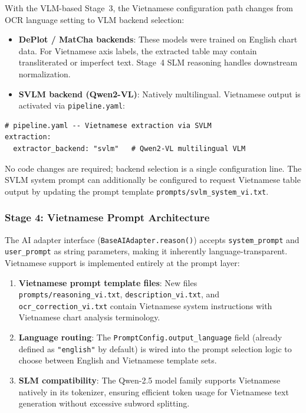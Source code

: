 With the VLM-based Stage~3, the Vietnamese configuration path changes from OCR language
setting to VLM backend selection:

\begin{itemize}
    \item \textbf{DePlot / MatCha backends}: These models were trained on English chart
          data. For Vietnamese axis labels, the extracted table may contain transliterated
          or imperfect text. Stage~4 SLM reasoning handles downstream normalization.
    \item \textbf{SVLM backend (Qwen2-VL)}: Natively multilingual. Vietnamese output is
          activated via \texttt{pipeline.yaml}:
\end{itemize}

\begin{verbatim}
# pipeline.yaml -- Vietnamese extraction via SVLM
extraction:
  extractor_backend: "svlm"   # Qwen2-VL multilingual VLM
\end{verbatim}

No code changes are required; backend selection is a single configuration line.
The SVLM system prompt can additionally be configured to request Vietnamese table output
by updating the prompt template \texttt{prompts/svlm\_system\_vi.txt}.

\subsubsection{Stage 4: Vietnamese Prompt Architecture}

The AI adapter interface (\texttt{BaseAIAdapter.reason()}) accepts
\texttt{system\_prompt} and \texttt{user\_prompt} as string parameters, making it
inherently language-transparent. Vietnamese support is implemented entirely at the
prompt layer:

\begin{enumerate}
    \item \textbf{Vietnamese prompt template files}: New files
          \texttt{prompts/reasoning\_vi.txt}, \texttt{description\_vi.txt}, and
          \texttt{ocr\_correction\_vi.txt} contain Vietnamese system instructions with
          Vietnamese chart analysis terminology.
    \item \textbf{Language routing}: The \texttt{PromptConfig.output\_language} field
          (already defined as \texttt{"english"} by default) is wired into the prompt
          selection logic to choose between English and Vietnamese template sets.
    \item \textbf{SLM compatibility}: The Qwen-2.5 model family supports Vietnamese
          natively in its tokenizer, ensuring efficient token usage for Vietnamese text
          generation without excessive subword splitting.
\end{enumerate}


